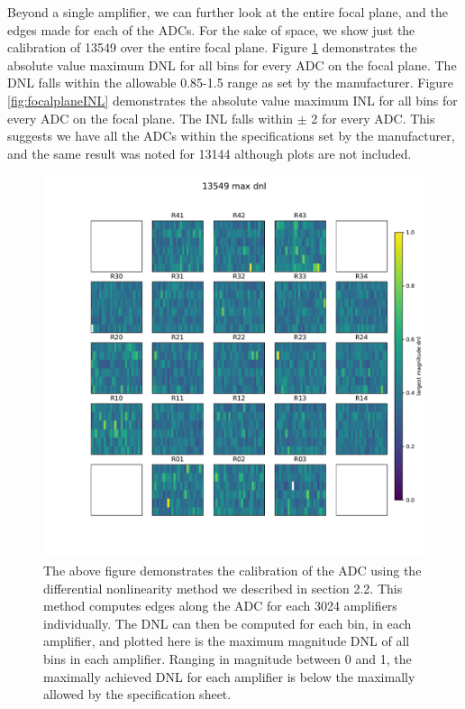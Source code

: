 \documentclass[11pt, letterpaper]{article}
\begin{document}
Beyond a single amplifier, we can further look at the entire focal plane, and the edges made for each of the ADCs. 
For the sake of space, we show just the calibration of 13549 over the entire focal plane. 
Figure \ref{fig:focalplaneDNL} demonstrates the absolute value maximum DNL for all bins for every ADC on the focal plane. 
The DNL falls within the allowable 0.85-1.5 range as set by the manufacturer.  
Figure \ref{fig:focalplaneINL} demonstrates the absolute value maximum INL for all bins for every ADC on the focal plane. 
The INL falls within $\pm$ 2 for every ADC. 
This suggests we have all the ADCs within the specifications set by the manufacturer, and the same result was noted for 13144 although plots are not included. 

\begin{figure}
    \centering
    \includegraphics[width=0.5\linewidth]{maxdnlplot.pdf}
    \caption{The above figure demonstrates the calibration of the ADC using the differential nonlinearity method we described in section 2.2. This method computes edges along the ADC for each 3024 amplifiers individually. The DNL can then be computed for each bin, in each amplifier, and plotted here is the maximum magnitude DNL of all bins in each amplifier. Ranging in magnitude between 0 and 1, the maximally achieved DNL for each amplifier is below the maximally allowed by the specification sheet. }
    \label{fig:focalplaneDNL}

\end{figure}
\end{document}
